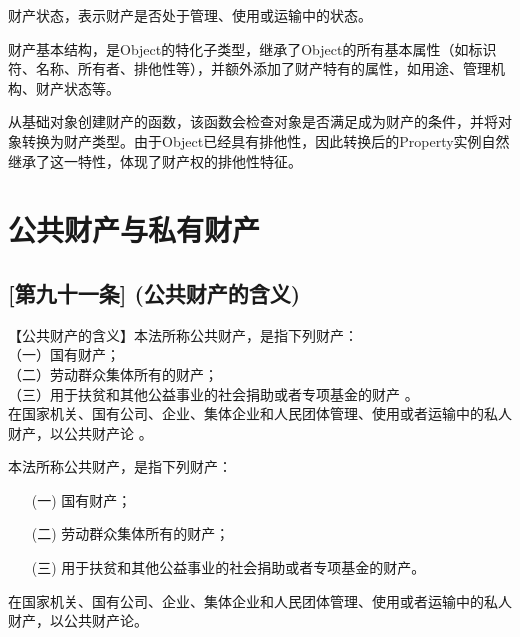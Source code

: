 \begin{definition}\label{PropertyState}
\leanok
{}
\uses{}
财产状态，表示财产是否处于管理、使用或运输中的状态。
\end{definition}

\begin{definition}\label{Property}
\leanok
{}
财产基本结构，是Object的特化子类型，继承了Object的所有基本属性（如标识符、名称、所有者、排他性等），并额外添加了财产特有的属性，如用途、管理机构、财产状态等。
\end{definition}

\begin{definition}\label{createPropertyFromObject}
\leanok
{}
从基础对象创建财产的函数，该函数会检查对象是否满足成为财产的条件，并将对象转换为财产类型。由于Object已经具有排他性，因此转换后的Property实例自然继承了这一特性，体现了财产权的排他性特征。
\end{definition}

\section{公共财产与私有财产}

\subsection{[第九十一条] (公共财产的含义)}

【公共财产的含义】本法所称公共财产，是指下列财产：\\
（一）国有财产；\\
（二）劳动群众集体所有的财产；\\
（三）用于扶贫和其他公益事业的社会捐助或者专项基金的财产 。\\
在国家机关、国有公司、企业、集体企业和人民团体管理、使用或者运输中的私人财产，以公共财产论 。

\begin{definition}\label{isPublicProperty}
\leanok
{}
本法所称公共财产，是指下列财产：
\begin{enumerate}
\item[(一)] 国有财产；
\item[(二)] 劳动群众集体所有的财产；
\item[(三)] 用于扶贫和其他公益事业的社会捐助或者专项基金的财产。
\end{enumerate}
在国家机关、国有公司、企业、集体企业和人民团体管理、使用或者运输中的私人财产，以公共财产论。
\end{definition}

